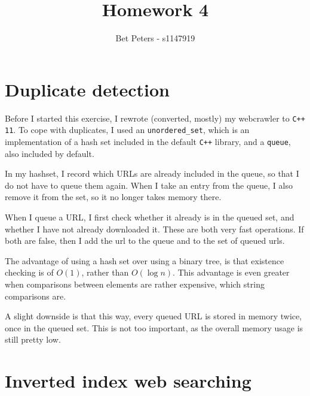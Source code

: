 \documentclass[12pt,a4paper]{article}
\author{Bet Peters - s1147919}
\title{Homework 4}
\begin{document}
\maketitle

\section{Duplicate detection}

Before I started this exercise, I rewrote (converted, mostly) my webcrawler to \texttt{C++ 11}. To cope with duplicates, I used an \texttt{unordered\_set}, which is an implementation of a hash set included in the default \texttt{C++} library, and a \texttt{queue}, also included by default.

In my hashset, I record which URLs are already included in the queue, so that I do not have to queue them again. When I take an entry from the queue, I also remove it from the set, so it no longer takes memory there.

When I queue a URL, I first check whether it already is in the queued set, and whether I have not already downloaded it. These are both very fast operations. If both are false, then I add the url to the queue and to the set of queued urls.

The advantage of using a hash set over using a binary tree, is that existence checking is of $O(1)$, rather than $O(\log n)$. This advantage is even greater when comparisons between elements are rather expensive, which string comparisons are.

A slight downside is that this way, every queued URL is stored in memory twice, once in the queued set. This is not too important, as the overall memory usage is still pretty low.

\section{Inverted index web searching}
\end{document}

